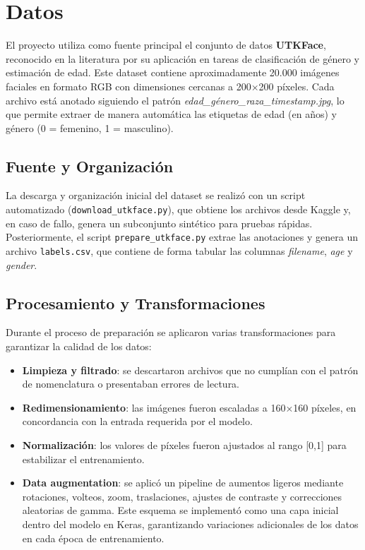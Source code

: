 \section{Datos}

El proyecto utiliza como fuente principal el conjunto de datos \textbf{UTKFace},
reconocido en la literatura por su aplicación en tareas de clasificación de género y 
estimación de edad. Este dataset contiene aproximadamente 20.000 imágenes faciales en formato RGB con 
dimensiones cercanas a 200×200 píxeles. 
Cada archivo está anotado siguiendo el patrón \textit{edad\_género\_raza\_timestamp.jpg}, 
lo que permite extraer de manera automática las etiquetas de edad (en años) y género (0 = femenino, 1 = masculino).

\subsection{Fuente y Organización}
La descarga y organización inicial del dataset se realizó con un script automatizado (\texttt{download\_utkface.py}), 
que obtiene los archivos desde Kaggle y, en caso de fallo, genera un subconjunto sintético para pruebas rápidas. 
Posteriormente, el script \texttt{prepare\_utkface.py} extrae las anotaciones y genera un archivo \texttt{labels.csv}, 
que contiene de forma tabular las columnas \textit{filename}, \textit{age} y \textit{gender}.

\subsection{Procesamiento y Transformaciones}
Durante el proceso de preparación se aplicaron varias transformaciones para garantizar la calidad de los datos:

\begin{itemize}
  \item \textbf{Limpieza y filtrado}: se descartaron archivos que no cumplían con el patrón de nomenclatura o presentaban errores de lectura.
  \item \textbf{Redimensionamiento}: las imágenes fueron escaladas a 160×160 píxeles, en concordancia con la entrada requerida por el modelo.
  \item \textbf{Normalización}: los valores de píxeles fueron ajustados al rango [0,1] para estabilizar el entrenamiento.
  \item \textbf{Data augmentation}: se aplicó un pipeline de aumentos ligeros mediante rotaciones, volteos, zoom, traslaciones, ajustes de contraste y correcciones aleatorias de gamma. Este esquema se implementó como una capa inicial dentro del modelo en Keras, garantizando variaciones adicionales de los datos en cada época de entrenamiento.
\end{itemize}

